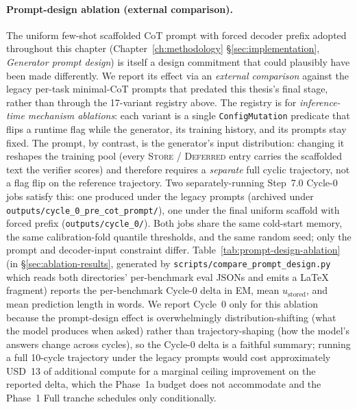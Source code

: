 \paragraph{Prompt-design ablation (external comparison).}
\label{par:prompt-design-ablation}
The uniform few-shot scaffolded CoT prompt with forced decoder
prefix adopted throughout this chapter (Chapter~\ref{ch:methodology}
\S\ref{sec:implementation}, \emph{Generator prompt design}) is
itself a design commitment that could plausibly have been made
differently. We report its effect via an \emph{external comparison}
against the legacy per-task minimal-CoT prompts that predated this
thesis's final stage, rather than through the 17-variant registry
above. The registry is for \emph{inference-time mechanism
ablations}: each variant is a single \texttt{ConfigMutation}
predicate that flips a runtime flag while the generator, its
training history, and its prompts stay fixed. The prompt, by
contrast, is the generator's input distribution: changing it
reshapes the training pool (every \textsc{Store} / \textsc{Deferred}
entry carries the scaffolded text the verifier scores) and
therefore requires a \emph{separate} full cyclic trajectory, not a
flag flip on the reference trajectory. Two separately-running
Step~7.0 Cycle-0 jobs satisfy this: one produced under the legacy
prompts (archived under
\texttt{outputs/cycle\_0\_pre\_cot\_prompt/}), one under the final
uniform scaffold with forced prefix
(\texttt{outputs/cycle\_0/}). Both jobs share the same cold-start
memory, the same calibration-fold quantile thresholds, and the
same random seed; only the prompt and decoder-input constraint
differ. Table~\ref{tab:prompt-design-ablation} (in
\S\ref{sec:ablation-results}, generated by
\texttt{scripts/compare\_prompt\_design.py} which reads both
directories' per-benchmark eval JSONs and emits a LaTeX fragment)
reports the per-benchmark Cycle-0 delta in EM, mean $u_{\text{stored}}$,
and mean prediction length in words. We report Cycle~0 only for
this ablation because the prompt-design effect is overwhelmingly
distribution-shifting (what the model produces when asked) rather
than trajectory-shaping (how the model's answers change across
cycles), so the Cycle-0 delta is a faithful summary; running a full
10-cycle trajectory under the legacy prompts would cost
approximately USD~13 of additional compute for a marginal ceiling
improvement on the reported delta, which the Phase~1a budget does
not accommodate and the Phase~1 Full tranche schedules only
conditionally.

